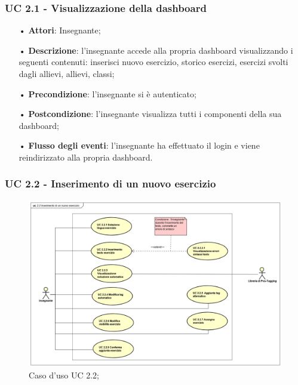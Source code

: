 \subsubsection{UC 2.1 - Visualizzazione della dashboard}
\begin{itemize}
	\item[•] \textbf{Attori}: Insegnante;
	\item[•] \textbf{Descrizione}: l'insegnante accede alla propria dashboard visualizzando i seguenti contenuti: inserisci nuovo esercizio, storico esercizi, esercizi svolti dagli allievi, allievi, classi;
	\item[•] \textbf{Precondizione}: l'insegnante si è autenticato;
	\item[•] \textbf{Postcondizione}: l'insegnante visualizza tutti i componenti della sua dashboard;
	\item[•] \textbf{Flusso degli eventi}: l’insegnante ha effettuato il login e viene reindirizzato alla propria dashboard.
\end{itemize}

\subsubsection{UC 2.2 - Inserimento di un nuovo esercizio}
\begin{figure}[H]
	\centering
	\includegraphics[width=17cm]{img/UC22.png} 
	\caption{Caso d'uso UC 2.2;}
\end{figure}

